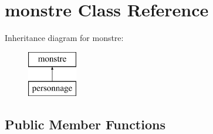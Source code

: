 \hypertarget{classmonstre}{}\section{monstre Class Reference}
\label{classmonstre}
Inheritance diagram for monstre\+:\begin{figure}[H]
\begin{center}
\leavevmode
\includegraphics[height=2.000000cm]{classmonstre}
\end{center}
\end{figure}
\subsection*{Public Member Functions}
